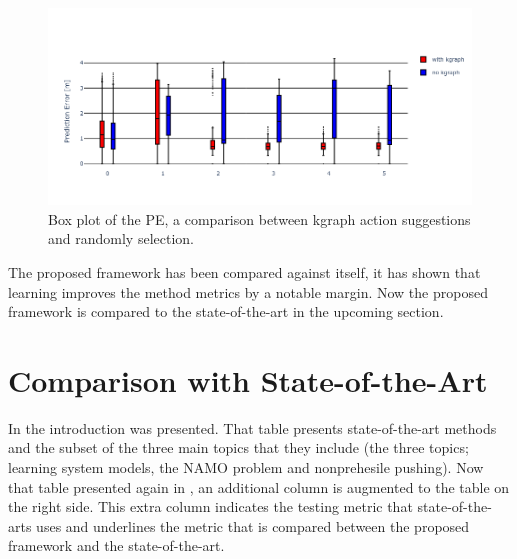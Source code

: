 \begin{figure}[H]
    \centering
    \includegraphics[width=\textwidth]{figures/results/random_push_pe_vs}
    \caption{Box plot of the \acl{PE}, a comparison between \ac{kgraph} action suggestions and randomly selection.}%
    \label{fig:random_push_pe_vs}
\end{figure}

The proposed framework has been compared against itself, it has shown that learning improves the method metrics by a notable margin. Now the proposed framework is compared to the state-of-the-art in the upcoming section.\bs
{}

\section{Comparison with State-of-the-Art}%
\label{sec:compare_with_related_papers}
In the introduction  was presented. That table presents state-of-the-art methods and the subset of the three main topics that they include (the three topics; learning system models, the \ac{NAMO} problem and nonprehesile pushing). Now that table presented again in , an additional column is augmented to the table on the right side. This extra column indicates the testing metric that state-of-the-arts uses and underlines the metric that is compared between the proposed framework and the state-of-the-art.\bs

